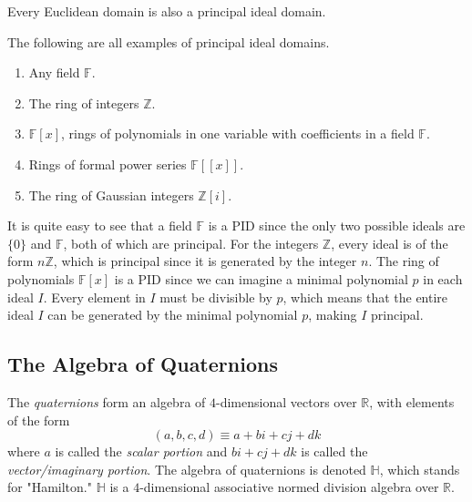 \documentclass{article}
\begin{document}
    \begin{proposition}
      Every Euclidean domain is also a principal ideal domain. 
    \end{proposition}

    \begin{example}
      The following are all examples of principal ideal domains. 
      \begin{enumerate}
        \item Any field $\mathbb{F}$. 
        \item The ring of integers $\mathbb{Z}$. 
        \item $\mathbb{F}[x]$, rings of polynomials in one variable with coefficients in a field $\mathbb{F}$. 
        \item Rings of formal power series $\mathbb{F}[[x]]$. 
        \item The ring of Gaussian integers $\mathbb{Z}[i]$. 
      \end{enumerate}
    \end{example}

    It is quite easy to see that a field $\mathbb{F}$ is a PID since the only two possible ideals are $\{0\}$ and $\mathbb{F}$, both of which are principal. For the integers $\mathbb{Z}$, every ideal is of the form $n\mathbb{Z}$, which is principal since it is generated by the integer $n$. The ring of polynomials $\mathbb{F}[x]$ is a PID since we can imagine a minimal polynomial $p$ in each ideal $I$. Every element in $I$ must be divisible by $p$, which means that the entire ideal $I$ can be generated by the minimal polynomial $p$, making $I$ principal. 

  \subsection{The Algebra of Quaternions}

    \begin{definition}
      The \textit{quaternions} form an algebra of $4$-dimensional vectors over $\mathbb{R}$, with elements of the form
      \begin{equation}
        (a, b, c, d) \equiv a + bi + cj + dk
      \end{equation}
      where $a$ is called the \textit{scalar portion} and $bi + cj + dk$ is called the \textit{vector/imaginary portion}. The algebra of quaternions is denoted $\mathbb{H}$, which stands for "Hamilton." $\mathbb{H}$ is a $4$-dimensional associative normed division algebra over $\mathbb{R}$. 
    \end{definition}
\end{document}
